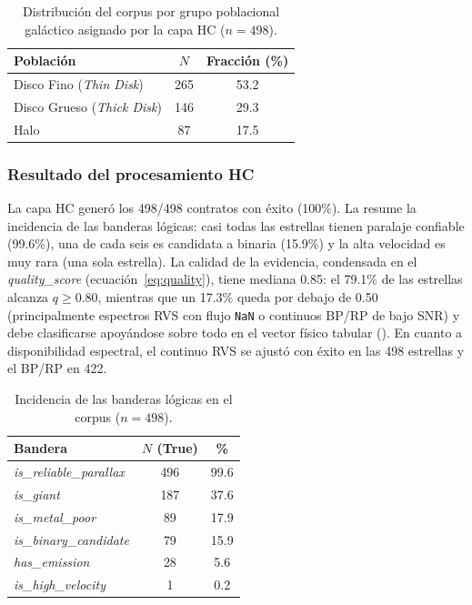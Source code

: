 \begin{table}[H]
  \centering
  \caption{Distribución del corpus por grupo poblacional galáctico asignado por la
  capa HC ($n=498$).}
  \label{tab:dist-pop}
  \begin{tabular}{lcc}
    \toprule
    Población & $N$ & Fracción (\%) \\
    \midrule
    Disco Fino (\emph{Thin Disk})   & 265 & 53.2 \\
    Disco Grueso (\emph{Thick Disk}) & 146 & 29.3 \\
    Halo                            & 87  & 17.5 \\
    \bottomrule
  \end{tabular}
\end{table}

\subsubsection{Resultado del procesamiento HC}
\label{sec:datos-hc}

La capa HC generó los \num{498}/\num{498} contratos con éxito (100\%). La
 resume la incidencia de las banderas lógicas: casi todas las
estrellas tienen paralaje confiable (99.6\%), una de cada seis es candidata a binaria
(15.9\%) y la alta velocidad es muy rara (una sola estrella). La calidad de la
evidencia, condensada en el \emph{quality\_score} (ecuación~\eqref{eq:quality}), tiene
mediana \num{0.85}: el 79.1\% de las estrellas alcanza $q \ge 0.80$, mientras que un
17.3\% queda por debajo de \num{0.50} (principalmente espectros RVS con flujo
\texttt{NaN} o continuos BP/RP de bajo SNR) y debe clasificarse apoyándose sobre todo
en el vector físico tabular (). En cuanto a disponibilidad
espectral, el continuo RVS se ajustó con éxito en las 498 estrellas y el BP/RP en 422.

\begin{table}[H]
  \centering
  \caption{Incidencia de las banderas lógicas en el corpus ($n=498$).}
  \label{tab:dist-flags}
  \begin{tabular}{lcc}
    \toprule
    Bandera & $N$ (True) & \% \\
    \midrule
    \emph{is\_reliable\_parallax} & 496 & 99.6 \\
    \emph{is\_giant}              & 187 & 37.6 \\
    \emph{is\_metal\_poor}        & 89  & 17.9 \\
    \emph{is\_binary\_candidate}  & 79  & 15.9 \\
    \emph{has\_emission}          & 28  & 5.6 \\
    \emph{is\_high\_velocity}     & 1   & 0.2 \\
    \bottomrule
  \end{tabular}
\end{table}

